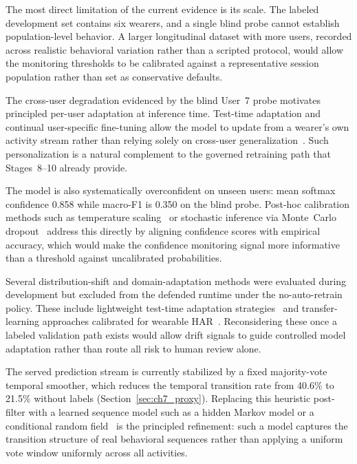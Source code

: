 The most direct limitation of the current evidence is its scale. The labeled development set contains six wearers, and a single blind probe cannot establish population-level behavior. A larger longitudinal dataset with more users, recorded across realistic behavioral variation rather than a scripted protocol, would allow the monitoring thresholds to be calibrated against a representative session population rather than set as conservative defaults.

The cross-user degradation evidenced by the blind User~7 probe motivates principled per-user adaptation at inference time. Test-time adaptation and continual user-specific fine-tuning allow the model to update from a wearer's own activity stream rather than relying solely on cross-user generalization~\cite{akbari2020personalizing,jha2021continual}. Such personalization is a natural complement to the governed retraining path that Stages~8--10 already provide.

The model is also systematically overconfident on unseen users: mean softmax confidence 0.858 while macro-F1 is 0.350 on the blind probe. Post-hoc calibration methods such as temperature scaling~\cite{guo2017calibration} or stochastic inference via Monte~Carlo dropout~\cite{gal2016dropout} address this directly by aligning confidence scores with empirical accuracy, which would make the confidence monitoring signal more informative than a threshold against uncalibrated probabilities.

Several distribution-shift and domain-adaptation methods were evaluated during development but excluded from the defended runtime under the no-auto-retrain policy. These include lightweight test-time adaptation strategies~\cite{wang2021tent} and transfer-learning approaches calibrated for wearable HAR~\cite{dhekane2024transfer,chakma2023imuda}. Reconsidering these once a labeled validation path exists would allow drift signals to guide controlled model adaptation rather than route all risk to human review alone.

The served prediction stream is currently stabilized by a fixed majority-vote temporal smoother, which reduces the temporal transition rate from 40.6\% to 21.5\% without labels (Section~\ref{sec:ch7_proxy}). Replacing this heuristic post-filter with a learned sequence model such as a hidden Markov model or a conditional random field~\cite{lester2006practical} is the principled refinement: such a model captures the transition structure of real behavioral sequences rather than applying a uniform vote window uniformly across all activities.


